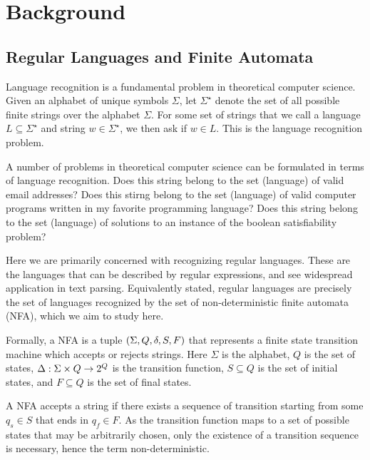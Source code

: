 
\section{Background}




\subsection{Regular Languages and Finite Automata}

Language recognition is a fundamental problem in theoretical computer science.
Given an alphabet of unique symbols \(\Sigma\),
let \(\Sigma^\star\) denote the set of all possible finite strings over
the alphabet \(\Sigma\).
For some set of strings that we call a language \(L \subseteq \Sigma^\star\)
and string \(w \in \Sigma^\star\),
we then ask if \(w \in L\).
This is the language recognition problem.

A number of problems in theoretical computer science can be formulated
in terms of language recognition.
Does this string belong to the set (language) of valid email addresses?
Does this stirng belong to the set (language) of valid
computer programs written in my favorite programming language?
Does this string belong to the set (language) of solutions
to an instance of the boolean satisfiability problem?

Here we are primarily concerned with recognizing regular languages.
These are the languages that can be described by regular expressions,
and see widespread application in text parsing.
Equivalently stated, regular languages are precisely the set of languages
recognized by the set of non-deterministic finite automata (NFA),
which we aim to study here.

Formally, a NFA is a tuple
\(\left(\Sigma, Q, \delta, S, F\right)\)
that represents a finite state transition machine
which accepts or rejects strings.
Here \(\Sigma\) is the alphabet,
\(Q\) is the set of states,
\(\Delta : \Sigma \times Q \to 2^{Q}\) is the transition function,
\(S \subseteq Q\) is the set of initial states,
and \(F \subseteq Q\) is the set of final states.

A NFA accepts a string if there exists a sequence of transition
starting from some \(q_s \in S\)
that ends in \(q_f \in F\).
As the transition function maps to a set of possible states that may
be arbitrarily chosen,
only the existence of a transition sequence is necessary,
hence the term non-deterministic.

